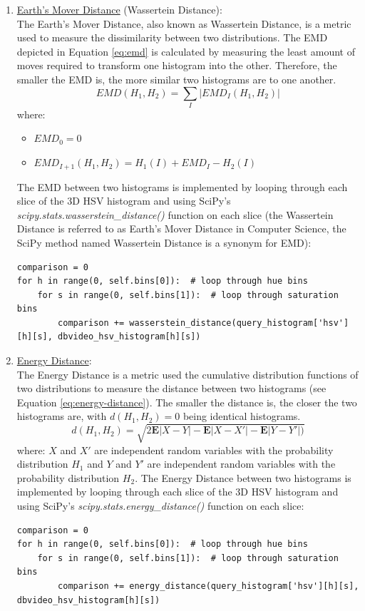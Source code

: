 \begin{enumerate}
    \item \underline{Earth's Mover Distance} (Wassertein Distance):\\
    The Earth's Mover Distance, also known as Wassertein Distance, is a metric used to measure the dissimilarity between two distributions. The EMD depicted in Equation \ref{eq:emd} is calculated by measuring the least amount of moves required to transform one histogram into the other. Therefore, the smaller the EMD is, the more similar two histograms are to one another.
    \begin{equation}
    \label{eq:emd}
        EMD(H_1,H_2)=\sum_I |EMD_I(H_1,H_2)|
    \end{equation}
    where:
        \begin{itemize}
            \item $EMD_0 = 0$
            \item $EMD_{I+1}(H_1,H_2) = H_1(I)+EMD_I-H_2(I)$
        \end{itemize}
    The EMD between two histograms is implemented by looping through each slice of the 3D HSV histogram and using SciPy's \textit{scipy.stats.wasserstein\_distance()} function on each slice (the Wassertein Distance is referred to as Earth's Mover Distance in Computer Science, the SciPy method named Wassertein Distance is a synonym for EMD):
\begin{lstlisting}[numbers=none]
comparison = 0
for h in range(0, self.bins[0]):  # loop through hue bins
    for s in range(0, self.bins[1]):  # loop through saturation bins
        comparison += wasserstein_distance(query_histogram['hsv'][h][s], dbvideo_hsv_histogram[h][s])
\end{lstlisting}
        
    \item \underline{Energy Distance}:\\
    The Energy Distance is a metric used the cumulative distribution functions of two distributions to measure the distance between two histograms (see Equation \ref{eq:energy-distance}). The smaller the distance is, the closer the two histograms are, with $d(H_1,H_2)=0$ being identical histograms.
    \begin{equation}
    \label{eq:energy-distance}
        d(H_1,H_2) = \sqrt{2\mathbf{E}|X-Y|-\mathbf{E}|X-X'|-\mathbf{E}|Y-Y'|)}
    \end{equation}
    where: $X$ and $X'$ are independent random variables with the probability distribution $H_1$ and $Y$ and $Y'$ are independent random variables with the probability distribution $H_2$.  The Energy Distance between two histograms is implemented by looping through each slice of the 3D HSV histogram and using SciPy's \textit{scipy.stats.energy\_distance()} function on each slice:
\begin{lstlisting}[numbers=none]
comparison = 0
for h in range(0, self.bins[0]):  # loop through hue bins
    for s in range(0, self.bins[1]):  # loop through saturation bins
        comparison += energy_distance(query_histogram['hsv'][h][s], dbvideo_hsv_histogram[h][s])
\end{lstlisting}
    
\end{enumerate}

